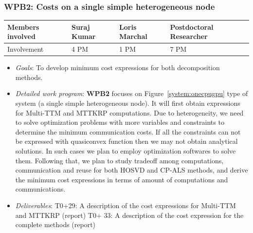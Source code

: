 \documentclass[a4paper,11pt]{article}
\newcommand{\goal}{{\color{orange2}  \emph{Goals}:} }
\newcommand{\dwp}{{\color{orange2}  \emph{Detailed work program}: }}
\newcommand{\deliverables}{{\color{orange2}  \emph{Deliverables}: }}
\begin{document}
	\subsubsection{\textbf{WPB2}: Costs on a single simple heterogeneous node}
	\vspace*{-0.385cm}\begin{table}[H]
		\begin{tabular}{llll}
			\hline
			\cellcolor{blue2}
			Members involved & Suraj Kumar& Loris Marchal & Postdoctoral Researcher \\
			\hline
			\cellcolor{orange2}
			Involvement      & 4 PM            & 1 PM & 7 PM \\
			\hline
		\end{tabular}
	\end{table}\vspace*{-0.25cm}
	\begin{itemize}[leftmargin=-1pt]
		\item[] \goal To develop minimum cost expressions for both decomposition methods. 
		\item[] \dwp \textbf{WPB2} focuses on Figure~\ref{system:onecpugpu} type of system (a single simple heterogeneous node). It will first obtain expressions for Multi-TTM and MTTKRP computations. Due to heterogeneity, we need to solve optimization problems with more variables and constraints to determine the minimum communication costs. If all the constraints can not be expressed with quasiconvex function then we may not obtain analytical solutions. In such cases we plan to employ optimization softwares to solve them.
		Following that, we plan to study tradeoff among computations, communication and reuse for both HOSVD and CP-ALS methods, and derive the minimum cost expressions in terms of amount of computations and communications. 
		\item[] \deliverables
		T0+29: A description of the cost expressions for Multi-TTM and MTTKRP (report)\newline
		T0+ 33: A description of the cost expression for the complete methods (report)
	\end{itemize}
	
\end{document}
